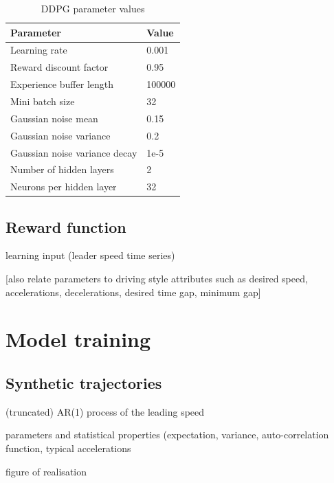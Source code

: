 \documentclass[review]{elsarticle}
\begin{document}
\begin{table}
	\caption{DDPG parameter values} 
	\label{tab:DDPGparameters} 
	\begin{center}
		\begin{tabular}{ p{} p{} }
			Parameter & Value \\ \hline
			Learning rate & 0.001 \\ 
			Reward discount factor & 0.95 \\ 
			Experience buffer length & 100000 \\ 
			Mini batch size & 32 \\ 			
			Gaussian noise mean & 0.15 \\ 
			Gaussian noise variance & 0.2 \\ 
			Gaussian noise variance decay  & 1e-5 \\ 
			Number of hidden layers & 2\\
			Neurons per hidden layer & 32\\
			

		\end{tabular}
	\end{center}
\end{table}


\subsection{Reward function}

learning input (leader speed time series)

[also relate parameters to driving style attributes such as desired
speed, accelerations, decelerations, desired time gap, minimum gap]


\section{Model training}

\subsection{Synthetic trajectories}

(truncated) AR(1) process of the leading speed

parameters and statistical properties (expectation, variance, auto-correlation
function, typical accelerations

figure of realisation
\end{document}
